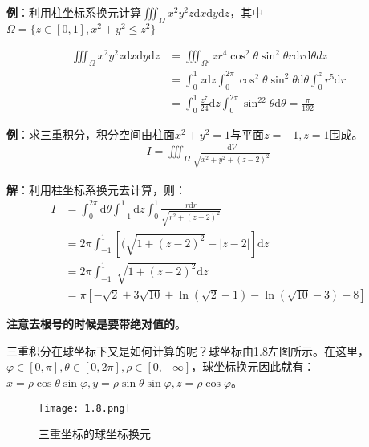 \documentclass{ctexart}
\let\oldtextbf\textbf
\renewcommand{\textbf}[1]{\textcolor{brown!50!red}{\oldtextbf{#1}}}
\begin{document}
\textbf{\color{brown!50!red}例}：利用柱坐标系换元计算$\iiint_\Omega x^2y^2z\mathrm{d}x\mathrm{d}y\mathrm{d}z$，其中$\Omega=\{z\in[0,1],x^2+y^2\leq z^2\}$

\begin{align*}
     \iiint_\Omega x^2y^2z\mathrm{d}x\mathrm{d}y\mathrm{d}z&=\iiint_{\Omega'}zr^4\cos^2\theta\sin
^2\theta  r\mathrm{d}r\mathrm{d}\theta  {d}z \\
&=\int_0^1z\mathrm{d}z \int_0^{2\pi}\cos^2\theta\sin^2\theta\mathrm{d}\theta \int_0^z r^5\mathrm
d{r}\\
&=\int_0^1\frac{z^7}{24}\mathrm{d}z\int_0^{2\pi}\sin^22\theta\mathrm{d}\theta=\frac{\pi}{192}   
\end{align*}

\textbf{\color{brown!50!red}例}：求三重积分，积分空间由柱面$x^2+y^2=1$与平面$z=-1,z=1$围成。
\begin{align*}
    I=\iiint_{\Omega}\frac{\mathrm{d}V }{\sqrt{x^2+y^2+(z-2)^2} } 
\end{align*}

\textbf{\color{brown!50!red}解}：利用柱坐标系换元去计算，则：
\begin{align*}
I&=\int_0^{2\pi}\mathrm{d}\theta \int_{-1}^1\mathrm{d}z\int_0^1\frac{r\mathrm{d}r }{\sqrt{r^2+(z-2)^2}}
\\&=2\pi \int_{-1}^1[(\sqrt{1+(z-2)^2}-|z-2|]\mathrm{d}z\\
&=2\pi \int_{-1}^1\sqrt[]{1+(z-2)^2}\mathrm{d}z  \\
&=\pi[-\sqrt{2}+3\sqrt{10}+\ln (\sqrt{2}-1)-\ln(\sqrt{10}-3)-8    ]  
\end{align*}

\textbf{\color{brown!50!red}注意去根号的时候是要带绝对值的}。

三重积分在球坐标下又是如何计算的呢？球坐标由1.8左图所示。在这里，$\varphi\in[0,\pi],\theta\in[0,2\pi],\rho\in[0,+\infty]$，球坐标换元因此就有：$x=\rho\cos\theta\sin\varphi,y=\rho\sin\theta\sin\varphi,z=\rho\cos\varphi$。
\begin{figure}[H]    
\centering     
\renewcommand{\figurename}{图}     
\renewcommand{\thefigure}{1.8}    
\begin{myimagebox}[width=0.65\textwidth] %
\texttt{[image: 1.8.png]} %
\end{myimagebox}     
\caption{\label{fig:1.8}三重坐标的球坐标换元}   
\end{figure}
\end{document}
